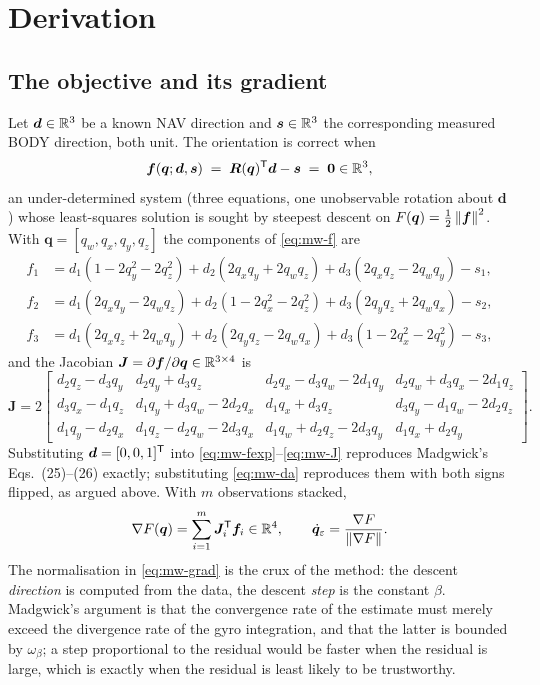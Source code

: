 \section{Derivation}

\subsection{The objective and its gradient}
Let $\bm{d}\in\mathbb{R}^3$ be a known NAV direction and $\bm{s}\in\mathbb{R}^3$ the corresponding measured
BODY direction, both unit. The orientation is correct when
\begin{equation}
\bm{f}(\bm{q};\bm{d},\bm{s}) \;=\; \bm{R}(\bm{q})^{\mathsf{T}}\bm{d}-\bm{s} \;=\; \bm{0}\in\mathbb{R}^3 ,
\label{eq:mw-f}
\end{equation}
an under-determined system (three equations, one unobservable rotation about $\bm{d}$) whose
least-squares solution is sought by steepest descent on
$F(\bm{q})=\tfrac12\left\lVert \bm{f} \right\rVert^2$. With $\bm{q}=[q_w,q_x,q_y,q_z]$ the components of
\eqref{eq:mw-f} are
\begin{align}
f_1 &= d_1(1-2q_y^2-2q_z^2) + d_2(2q_xq_y+2q_wq_z) + d_3(2q_xq_z-2q_wq_y) - s_1,\nonumber\\
f_2 &= d_1(2q_xq_y-2q_wq_z) + d_2(1-2q_x^2-2q_z^2) + d_3(2q_yq_z+2q_wq_x) - s_2,\label{eq:mw-fexp}\\
f_3 &= d_1(2q_xq_z+2q_wq_y) + d_2(2q_yq_z-2q_wq_x) + d_3(1-2q_x^2-2q_y^2) - s_3,\nonumber
\end{align}
and the Jacobian $\bm{J}=\partial\bm{f}/\partial\bm{q}\in\mathbb{R}^{3\times4}$ is
\begin{equation}
\bm{J} = 2\!\begin{bmatrix}
 d_2q_z-d_3q_y & d_2q_y+d_3q_z & d_2q_x-d_3q_w-2d_1q_y & d_2q_w+d_3q_x-2d_1q_z\\
 d_3q_x-d_1q_z & d_1q_y+d_3q_w-2d_2q_x & d_1q_x+d_3q_z & d_3q_y-d_1q_w-2d_2q_z\\
 d_1q_y-d_2q_x & d_1q_z-d_2q_w-2d_3q_x & d_1q_w+d_2q_z-2d_3q_y & d_1q_x+d_2q_y
\end{bmatrix}.
\label{eq:mw-J}
\end{equation}
Substituting $\bm{d}=[0,0,1]^{\mathsf{T}}$ into \eqref{eq:mw-fexp}--\eqref{eq:mw-J} reproduces Madgwick's
Eqs.~(25)--(26) exactly; substituting \eqref{eq:mw-da} reproduces them with both signs flipped, as
argued above. With $m$ observations stacked,
\begin{equation}
\nabla F(\bm{q}) = \sum_{i=1}^{m}\bm{J}_i^{\mathsf{T}}\bm{f}_i \in\mathbb{R}^4,
\qquad
\dot{\bm{q}}_\varepsilon = \frac{\nabla F}{\left\lVert \nabla F \right\rVert} .
\label{eq:mw-grad}
\end{equation}
The normalisation in \eqref{eq:mw-grad} is the crux of the method: the descent \emph{direction} is
computed from the data, the descent \emph{step} is the constant $\beta$. Madgwick's argument is
that the convergence rate of the estimate must merely exceed the divergence rate of the gyro
integration, and that the latter is bounded by $\omega_\beta$; a step proportional to the residual
would be faster when the residual is large, which is exactly when the residual is least likely to be
trustworthy.

